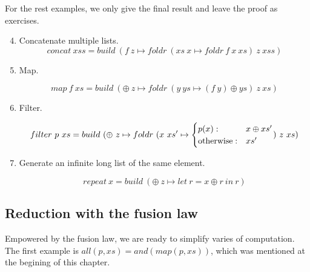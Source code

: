\documentclass[b5paper]{article}
\begin{document}
For the rest examples, we only give the final result and leave the proof as exercises.

\begin{enumerate}
\setcounter{enumi}{3}
\item Concatenate multiple lists.
\[
concat\ xss = build\ (f\ z \mapsto foldr\ (xs\ x \mapsto foldr\ f\ x\ xs)\ z\ xss)
\]

\item Map.

\[
map\ f\ xs = build\ (\oplus\ z \mapsto foldr\ (y\ ys \mapsto (f\ y) \oplus ys)\ z\ xs)
\]

\item Filter.

\[
filter\ p\ xs = build\ (\oplus\ z \mapsto foldr\ (x\ xs' \mapsto
  \begin{cases}
    p(x): & x \oplus xs' \\
    \text{otherwise}: & xs' \\
  \end{cases})\ z\ xs) \\
\]

\item Generate an infinite long list of the same element.

\[
repeat\ x = build\ (\oplus\ z \mapsto let\ r = x \oplus r\ in\ r)
\]

\end{enumerate}

\subsection{Reduction with the fusion law}

Empowered by the fusion law, we are ready to simplify varies of computation. The first example is $all(p, xs) = and(map(p, xs))$, which was mentioned at the begining of this chapter.
\end{document}

